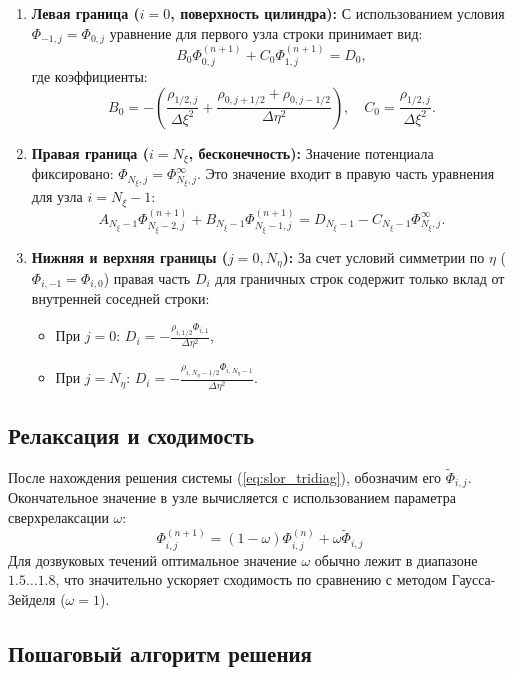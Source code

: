 \documentclass[a4paper,12pt]{article}
\begin{document}
	\begin{enumerate}
		\item \textbf{Левая граница ($i=0$, поверхность цилиндра):} 
		С использованием условия $\Phi_{-1,j} = \Phi_{0,j}$ уравнение для первого узла строки принимает вид:
		\[ B_0 \Phi_{0,j}^{(n+1)} + C_0 \Phi_{1,j}^{(n+1)} = D_0, \]
		где коэффициенты:
		\[ B_0 = -\left( \frac{\rho_{1/2,j}}{\Delta \xi^2} + \frac{\rho_{0,j+1/2} + \rho_{0,j-1/2}}{\Delta \eta^2} \right), \quad C_0 = \frac{\rho_{1/2,j}}{\Delta \xi^2}. \]
		
		\item \textbf{Правая граница ($i=N_\xi$, бесконечность):} 
		Значение потенциала фиксировано: $\Phi_{N_\xi,j} = \Phi_{N_\xi,j}^\infty$. Это значение входит в правую часть уравнения для узла $i=N_\xi-1$:
		\[ A_{N_\xi-1} \Phi_{N_\xi-2,j}^{(n+1)} + B_{N_\xi-1} \Phi_{N_\xi-1,j}^{(n+1)} = D_{N_\xi-1} - C_{N_\xi-1} \Phi_{N_\xi,j}^\infty. \]
		
		\item \textbf{Нижняя и верхняя границы ($j=0, N_\eta$):} 
		За счет условий симметрии по $\eta$ ($\Phi_{i,-1} = \Phi_{i,0}$) правая часть $D_i$ для граничных строк содержит только вклад от внутренней соседней строки:
		\begin{itemize}
			\item При $j=0$: $D_i = \displaystyle - \frac{\rho_{i,1/2} \Phi_{i,1}}{\Delta \eta^2}$,
			\item При $j=N_\eta$: $D_i = \displaystyle - \frac{\rho_{i,N_\eta-1/2} \Phi_{i,N_\eta-1}}{\Delta \eta^2}$.
		\end{itemize}
	\end{enumerate}


	\subsection{Релаксация и сходимость}
	
	После нахождения решения системы (\ref{eq:slor_tridiag}), обозначим его $\tilde{\Phi}_{i,j}$. Окончательное значение в узле вычисляется с использованием параметра сверхрелаксации $\omega$:
	\begin{equation}
		\Phi_{i,j}^{(n+1)} = (1 - \omega) \Phi_{i,j}^{(n)} + \omega \tilde{\Phi}_{i,j}
	\end{equation}
	Для дозвуковых течений оптимальное значение $\omega$ обычно лежит в диапазоне $1.5 \dots 1.8$, что значительно ускоряет сходимость по сравнению с методом Гаусса-Зейделя ($\omega = 1$).

	\subsection{Пошаговый алгоритм решения}
	
\end{document}
